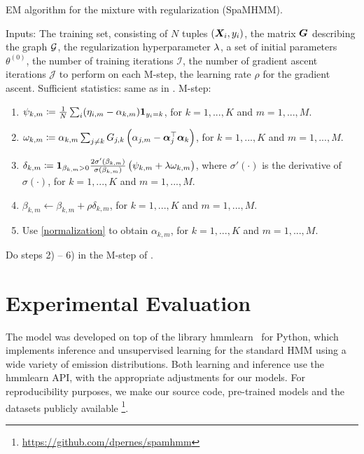 \begin{algorithm}
	\caption{EM algorithm for the mixture with regularization (SpaMHMM).}
	\label{alg:spamhmm}
	\begin{algorithmic}
		\State Inputs: The training set, consisting of $N$ tuples $({\bm{X}}_i,y_i)$, the matrix ${\bm{G}}$ describing the graph ${\mathcal{G}}$, the regularization hyperparameter $\lambda$, a set of initial parameters $\theta^{(0)}$, the number of training iterations $\mathcal{I}$, the number of gradient ascent iterations $\mathcal{J}$ to perform on each M-step, the learning rate $\rho$ for the gradient ascent.
		\State Sufficient statistics: same as in .
		\State M-step:
		\begin{enumerate}
			\item $\psi_{k,m} \coloneqq \frac{1}{N}\sum_i (\eta_{i,m} - \alpha_{k,m}) \bm{1}_{y_i=k}$, for $k=1,...,K$ and $m=1,...,M$.
			\item $\omega_{k,m} \coloneqq \alpha_{k,m} \sum_{j \neq k} {G}_{j,k}\left(\alpha_{j,m} - {\bm{\alpha}}_j ^\top {\bm{\alpha}}_k \right)$, for $k=1,...,K$ and $m=1,...,M$.
			\item $\delta_{k,m} \coloneqq \bm{1}_{\beta_{k,m} > 0} \frac{2\sigma'(\beta_{k,m})}{\sigma(\beta_{k,m})}\left(\psi_{k,m} + \lambda \omega_{k,m}\right)$, where $\sigma'(\cdot)$ is the derivative of $\sigma(\cdot)$, for $k=1,...,K$ and $m=1,...,M$. 
			\item $\beta_{k,m} \leftarrow \beta_{k,m} + \rho \delta_{k,m}$, for $k=1,...,K$ and $m=1,...,M$.
			\item Use \eqref{normalization} to obtain $\alpha_{k,m}$, for $k=1,...,K$ and $m=1,...,M$.
		\end{enumerate}
		\EndFor
		\State Do steps 2) -- 6) in the M-step of . 
		\EndFor
	\end{algorithmic}
\end{algorithm}

\section{Experimental Evaluation}
\label{sec:experiments}
The model was developed on top of the library hmmlearn~\citet{hmmlearn} for Python, which implements inference and unsupervised learning for the standard HMM using a wide variety of emission distributions. Both learning and inference use the hmmlearn API, with the appropriate adjustments for our models. For reproducibility purposes, we make our source code, pre-trained models and the datasets publicly available \footnote{\url{https://github.com/dpernes/spamhmm}}.

